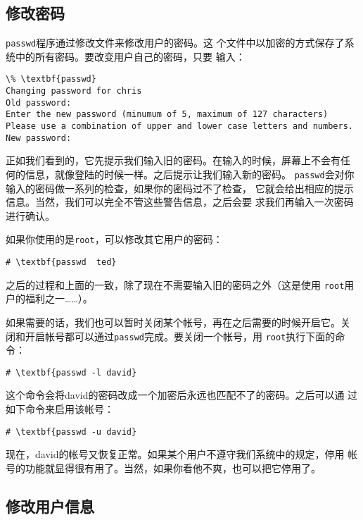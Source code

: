 \subsection{修改密码}
\label{sec:systemAdministration:usersAndGroups:changingPasswords}
\texttt{passwd}程序通过修改文件来修改用户的密码。这
个文件中以加密的方式保存了系统中的所有密码。要改变用户自己的密码，只要
输入：
\begin{Verbatim}[frame=single, commandchars=\\\{\}]
\% \textbf{passwd}
Changing password for chris
Old password:
Enter the new password (minumum of 5, maximum of 127 characters)
Please use a combination of upper and lower case letters and numbers.
New password:
\end{Verbatim}

正如我们看到的，它先提示我们输入旧的密码。在输入的时候，屏幕上不会有任
何的信息，就像登陆的时候一样。之后提示让我们输入新的密码。
\texttt{passwd}会对你输入的密码做一系列的检查，如果你的密码过不了检查，
它就会给出相应的提示信息。当然，我们可以完全不管这些警告信息，之后会要
求我们再输入一次密码进行确认。

如果你使用的是\texttt{root}，可以修改其它用户的密码：
\begin{Verbatim}[frame=single, commandchars=\\\{\}]
# \textbf{passwd  ted}
\end{Verbatim}
之后的过程和上面的一致，除了现在不需要输入旧的密码之外（这是使用
\texttt{root}用户的福利之一……）。

如果需要的话，我们也可以暂时关闭某个帐号，再在之后需要的时候开启它。关
闭和开启帐号都可以通过\texttt{passwd}完成。要关闭一个帐号，用
\texttt{root}执行下面的命令：
\begin{Verbatim}[frame=single, commandchars=\\\{\}]
# \textbf{passwd -l david}
\end{Verbatim}
这个命令会将david的密码改成一个加密后永远也匹配不了的密码。之后可以通
过如下命令来启用该帐号：
\begin{Verbatim}[frame=single, commandchars=\\\{\}]
# \textbf{passwd -u david}
\end{Verbatim}

现在，david的帐号又恢复正常。如果某个用户不遵守我们系统中的规定，停用
帐号的功能就显得很有用了。当然，如果你看他不爽，也可以把它停用了。


\subsection{修改用户信息}
\label{sec:systemAdministration:usersAndGroups:changingUserInformation}

